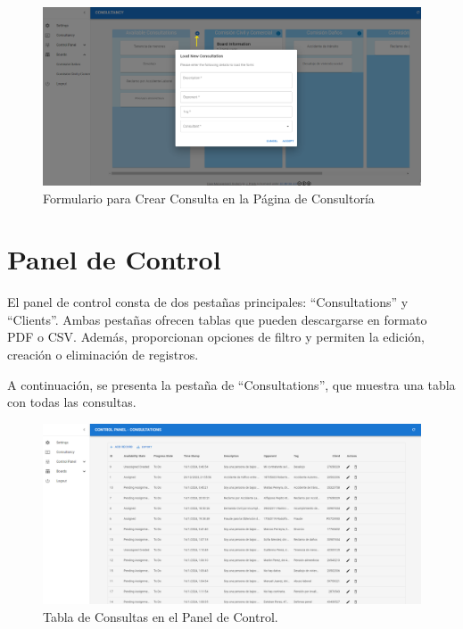 \begin{figure}[H]
    \centering
    \includegraphics[width=1\linewidth]{fig/crear-consulta-consultancy.png}
    \caption{Formulario para Crear Consulta en la Página de Consultoría}
    \label{fig:formulario-crear-consulta}
\end{figure}




\section{Panel de Control}
El panel de control consta de dos pestañas principales: ``Consultations'' y ``Clients''. Ambas pestañas ofrecen tablas que pueden descargarse en formato PDF o CSV. Además, proporcionan opciones de filtro y permiten la edición, creación o eliminación de registros.

A continuación, se presenta la pestaña de ``Consultations'', que muestra una tabla con todas las consultas.

\begin{figure}[H]
    \centering
    \includegraphics[width=1\linewidth]{fig/consultation-real-page.png}
    \caption{Tabla de Consultas en el Panel de Control.}
    \label{fig:consultations-table}
\end{figure}


